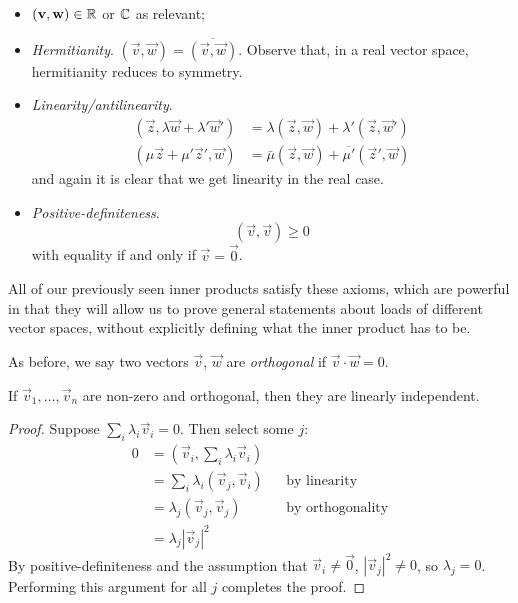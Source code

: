 \documentclass{../template/note}
\begin{document}
    \begin{itemize}
        \item \((\vec v, \vec w) \in \RR\) or \(\mathbb C\) as relevant;
        \item \emph{Hermitianity}. \((\vec v, \vec w) = \overline{(\vec v, \vec w)}\). Observe that, in a real vector space, hermitianity reduces to symmetry.
        \item \emph{Linearity/antilinearity}.
        \begin{align*}
            (\vec z, \lambda \vec w + \lambda ' \vec w') &= \lambda (\vec z, \vec w) + \lambda ' (\vec z, \vec w') \\
            (\mu \vec z + \mu' \vec z', \vec w) &= \bar \mu (\vec z, \vec w) + \overline{\mu'}(\vec z', \vec w)
        \end{align*}
        and again it is clear that we get linearity in the real case.
        \item \emph{Positive-definiteness}.
        \[
            (\vec v, \vec v) \geq 0
        \]
        with equality if and only if \(\vec v = \vec 0\).
    \end{itemize}
    
    All of our previously seen inner products satisfy these axioms, which are powerful in that they will allow us to prove general statements about loads of different vector spaces, without explicitly defining what the inner product has to be.

    \begin{definition}
        As before, we say two vectors \(\vec v\), \(\vec w\) are \emph{orthogonal} if \(\vec v \cdot \vec w = 0\).
    \end{definition}
    
    \begin{proposition}
        If \(\vec v_1, \dots, \vec v_n\) are non-zero and orthogonal, then they are linearly independent.
    \end{proposition}
    
    \begin{proof}
        Suppose \(\sum_{i} \lambda_i \vec v_i = 0\). Then select some \(j\):
        \begin{align*}
            0 &= \left(\vec v_i, \sum_i \lambda_i \vec v_i\right) \\
            &= \sum_i \lambda_i (\vec v_j, \vec v_i) && \text{by linearity} \\
            &= \lambda_j (\vec v_j, \vec v_j) && \text{by orthogonality} \\
            &= \lambda_j |\vec v_j|^2            
        \end{align*}
        By positive-definiteness and the assumption that \(\vec v_i \neq \vec 0\), \(|\vec v_j|^2 \neq 0\), so \(\lambda_j = 0\). Performing this argument for all \(j\) completes the proof.
    \end{proof}
    
\end{document}
